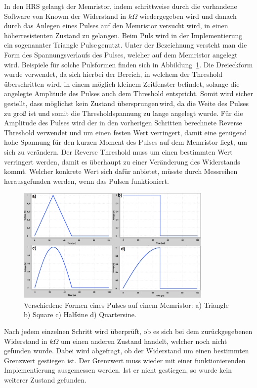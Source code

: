 In den HRS gelangt der Memristor, indem schrittweise durch die vorhandene Software von Knowm der Widerstand in $k\Omega$ wiedergegeben wird und danach durch das Anlegen eines Pulses auf den Memristor versucht wird, in einen höherresistenten Zustand zu gelangen. Beim Puls wird in der Implementierung ein sogenannter \glqq Triangle Pulse\grqq\,genutzt. Unter der Bezeichnung versteht man die Form des Spannungsverlaufs des Pulses, welcher auf dem Memristor angelegt wird. Beispiele für solche Pulsformen finden sich in Abbildung~\ref{fig:Pulsformen}. Die Dreieckform wurde verwendet, da sich hierbei der Bereich, in welchem der Threshold überschritten wird, in einem möglich kleinem Zeitfenster befindet, solange die angelegte Amplitude des Pulses auch dem Threshold entspricht. Somit wird sicher gestellt, dass möglichst kein Zustand \glqq übersprungen\grqq\,wird, da die Weite des Pulses zu groß ist und somit die Thresholdspannung zu lange angelegt wurde. Für die Amplitude des Pulses wird der in den vorherigen Schritten berechnete Reverse Threshold verwendet und um einen festen Wert verringert, damit eine genügend hohe Spannung für den kurzen Moment des Pulses auf dem Memristor liegt, um sich zu verändern. Der Reverse Threshold muss um einen bestimmten Wert verringert werden, damit es überhaupt zu einer Veränderung des Widerstands kommt. Welcher konkrete Wert sich dafür anbietet, müsste durch Messreihen herausgefunden werden, wenn das Pulsen funktioniert.

\begin{figure}
  \centering
    \includegraphics[width=0.85\textwidth]{images/Pulsformen.png}
  \caption{Verschiedene Formen eines Pulses auf einem Memristor: a) Triangle b) Square c) Halfsine d) Quartersine.}
  \label{fig:Pulsformen}
\end{figure}

Nach jedem einzelnen Schritt wird überprüft, ob es sich bei dem zurückgegebenen Widerstand in $k\Omega$ um einen anderen Zustand handelt, welcher noch nicht gefunden wurde. Dabei wird abgefragt, ob der Widerstand um einen bestimmten Grenzwert gestiegen ist. Der Grenzwert muss wieder mit einer funktionierenden Implementierung ausgemessen werden. Ist er nicht gestiegen, so wurde kein weiterer Zustand gefunden.

